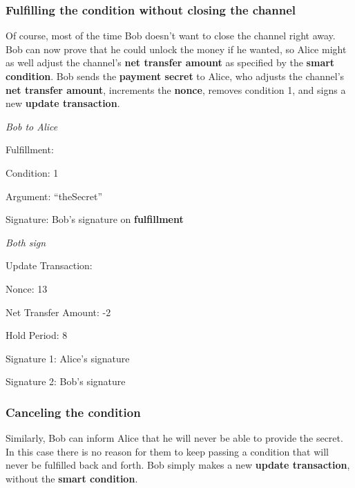 \documentclass[a4paper]{article}
\newcommand{\bgls}[1]{\textbf{\gls{#1}}}
\newenvironment{mydescription}
{\begin{description}
\setlength{\itemsep}{5pt}
  \setlength{\parskip}{0pt}
  \setlength{\labelsep}{5pt}
}{
\end{description}}
\begin{document}
\subsubsection{Fulfilling the condition without closing the channel}

Of course, most of the time Bob doesn't want to close the channel right away. Bob can now prove that he could unlock the money if he wanted, so Alice might as well adjust the channel's \bgls{net transfer amount} as specified by the \bgls{smart condition}. Bob sends the \bgls{payment secret} to Alice, who adjusts the channel's \bgls{net transfer amount}, increments the \bgls{nonce}, removes condition 1, and signs a new \bgls{update transaction}.

\begin{mdframed}[style=message]{\emph{Bob to Alice}}
\begin{mydescription}
\item[Fulfillment:] \hfill
\begin{mydescription}
  \item[Condition:] 1
  \item[Argument:] ``theSecret''
\end{mydescription}
\item[Signature:] Bob's signature on \bgls{fulfillment}
\end{mydescription}
\end{mdframed}

\begin{mdframed}[style=message]{\emph{Both sign}}
\begin{mydescription}
\item[Update Transaction:] \hfill
\begin{mydescription}
  \item[Nonce:] 13
  \item[Net Transfer Amount:] -2
  \item[Hold Period:] 8
\end{mydescription}
\item[Signature 1:] Alice's signature
\item[Signature 2:] Bob's signature
\end{mydescription}
\end{mdframed}

\subsubsection{Canceling the condition}

Similarly, Bob can inform Alice that he will never be able to provide the secret. In this case there is no reason for them to keep passing a condition that will never be fulfilled back and forth. Bob simply makes a new \bgls{update transaction}, without the \bgls{smart condition}.
\end{document}

